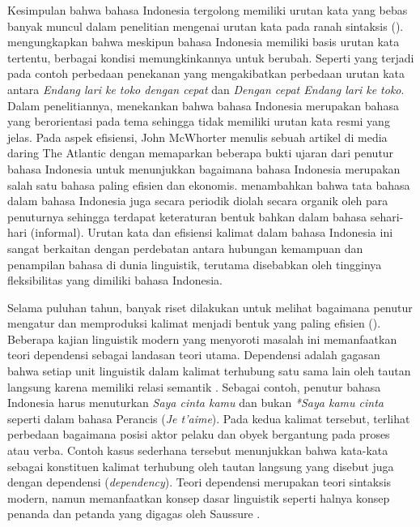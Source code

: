 Kesimpulan bahwa bahasa Indonesia tergolong memiliki urutan kata yang bebas banyak muncul dalam penelitian mengenai urutan kata pada ranah sintaksis (\citealp{stack2005word, postman2004processing}). \cite{sneddon2010indonesian} mengungkapkan bahwa meskipun bahasa Indonesia memiliki basis urutan kata tertentu, berbagai kondisi memungkinkannya untuk berubah. Seperti yang terjadi pada contoh perbedaan penekanan yang mengakibatkan perbedaan urutan kata antara \textit{Endang lari ke toko dengan cepat} dan \textit{Dengan cepat Endang lari ke toko}. Dalam penelitiannya, \cite{postman2004processing} menekankan bahwa bahasa Indonesia merupakan bahasa yang berorientasi pada tema sehingga tidak memiliki urutan kata resmi yang jelas. Pada aspek efisiensi, John McWhorter menulis sebuah artikel di media daring The Atlantic \citep{mcwhorter2016efficient} dengan memaparkan beberapa bukti ujaran dari penutur bahasa Indonesia untuk menunjukkan bagaimana bahasa Indonesia merupakan salah satu bahasa paling efisien dan ekonomis. \cite{mcwhorter2016efficient} menambahkan bahwa tata bahasa dalam bahasa Indonesia juga secara periodik diolah secara organik oleh para penuturnya sehingga terdapat keteraturan bentuk bahkan dalam bahasa sehari-hari (informal). Urutan kata dan efisiensi kalimat dalam bahasa Indonesia ini sangat berkaitan dengan perdebatan antara hubungan kemampuan dan penampilan bahasa di dunia linguistik, terutama disebabkan oleh tingginya fleksibilitas yang dimiliki bahasa Indonesia.

Selama puluhan tahun, banyak riset dilakukan untuk melihat bagaimana penutur mengatur dan memproduksi kalimat menjadi bentuk yang paling efisien (\citealp{chomsky2005three, hawkins2004efficiency, zipf1935psycho, zipf1949human}). Beberapa kajian linguistik modern yang menyoroti masalah ini memanfaatkan teori dependensi sebagai landasan teori utama. Dependensi adalah gagasan bahwa setiap unit linguistik dalam kalimat terhubung satu sama lain oleh tautan langsung karena memiliki relasi semantik \citep{tesniere1959elements}. Sebagai contoh, penutur bahasa Indonesia harus menuturkan \textit{Saya cinta kamu} dan bukan \textit{*Saya kamu cinta} seperti dalam bahasa Perancis (\textit{Je t'aime}). Pada kedua kalimat tersebut, terlihat perbedaan bagaimana posisi aktor pelaku dan obyek bergantung pada proses atau verba. Contoh kasus sederhana tersebut menunjukkan bahwa kata-kata sebagai konstituen kalimat terhubung oleh tautan langsung yang disebut juga dengan dependensi (\textit{dependency}). Teori dependensi merupakan teori sintaksis modern, namun memanfaatkan konsep dasar linguistik seperti halnya konsep penanda dan petanda yang digagas oleh Saussure \citep{key2017course}. 

